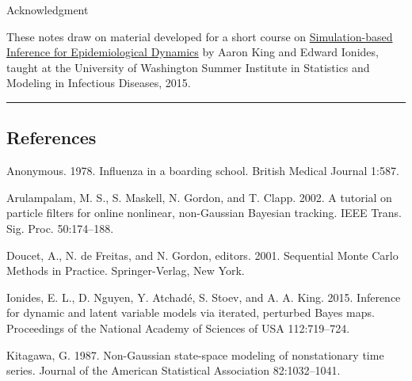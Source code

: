 \documentclass[]{article}
\begin{document}
Acknowledgment

These notes draw on material developed for a short course on
\href{http://kingaa.github.io/sbied/}{Simulation-based Inference for
Epidemiological Dynamics} by Aaron King and Edward Ionides, taught at
the University of Washington Summer Institute in Statistics and Modeling
in Infectious Diseases, 2015.

\begin{center}\rule{0.5\linewidth}{\linethickness}\end{center}

\subsection*{References}\label{references}

\hypertarget{refs}{}
\hypertarget{ref-anonymous78}{}
Anonymous. 1978. Influenza in a boarding school. British Medical Journal
1:587.

\hypertarget{ref-arulampalam02}{}
Arulampalam, M. S., S. Maskell, N. Gordon, and T. Clapp. 2002. A
tutorial on particle filters for online nonlinear, non-Gaussian Bayesian
tracking. IEEE Trans. Sig. Proc. 50:174--188.

\hypertarget{ref-doucet01}{}
Doucet, A., N. de Freitas, and N. Gordon, editors. 2001. Sequential
Monte Carlo Methods in Practice. Springer-Verlag, New York.

\hypertarget{ref-ionides15}{}
Ionides, E. L., D. Nguyen, Y. Atchadé, S. Stoev, and A. A. King. 2015.
Inference for dynamic and latent variable models via iterated, perturbed
Bayes maps. Proceedings of the National Academy of Sciences of USA
112:719--724.

\hypertarget{ref-kitagawa87}{}
Kitagawa, G. 1987. Non-Gaussian state-space modeling of nonstationary
time series. Journal of the American Statistical Association
82:1032--1041.
\end{document}
